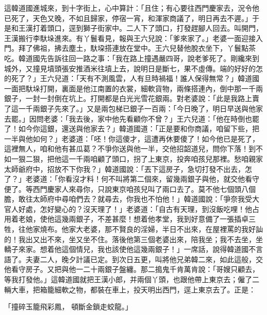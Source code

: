 \begin{showcontents}{}
這韓道國進城來，到十字街上，心中算計：「且住；有心要往西門慶家去，況令他已死了，天色又晚，不如且歸家，停宿一宵，和渾家商議了，明日再去不遲。」于是和王漢打着頭口，逕到獅子街家中。二人下了頭口，打發趕腳人回去。叫開門，王漢搬行李馱垛進來。有丫鬟看見，報與王六兒說：「爹來家了。」老婆一面迎接入門。拜了佛祖，拂去塵土，馱垜搭連放在堂中。王六兒替他脫衣坐下，丫鬟點茶吃。韓道國先告訴往回一路之事：「我在路上撞遇嚴四哥，說老爹死了。剛纔來到城外，又撞見墳頭張安推酒米往墳上去，說明日是斷七，果不虛傳。端的好好的怎的死了？」王六兒道：「天有不測風雲，人有旦時禍福！誰人保得無常？」韓道國一面把馱垛打開，裏面是他江南置的衣裳，細軟貨物，兩條搭連內，倒中那一千兩銀子，一封一封倒在坑上。打開都是白光光雪花銀兩。對老婆說：「此是我路上賣了這一千兩銀子先來了。」又是兩包梯已銀子一百兩：「今日晚了，明日早送與他家去罷。」因問老婆：「我去後，家中他先看顧你不曾？」王六兒道：「他在時倒也罷了！如今你這銀，還送與他家去？」韓道國道：「正是要和你商議，咱留下些，把一半與他如何？」老婆道：「呸！你這傻才，這遭再休要傻了！如今他已是死了，這裡無人，咱和他有甚瓜葛？不爭你送與他一半，交他招韶道兒，問你下落！到不如一狠二狠，把他這一千兩咱顧了頭口，拐了上東京，投奔咱孩兒那裡。愁咱親家太師爺府中，招放不下你我？」韓道國說：「丟下這房子，急切打發不出去，怎了？」老婆道：「你看沒才料！何不叫將第二個來，留幾兩銀子與他，就交他看守便了。等西門慶家人來尋你，只說東京咱孩兒叫了兩口去了。莫不他七個頭八個膽，敢往太師府中尋咱們去？就尋去，你我也不怕他！」韓道國說：「爭奈我受大官人好處，怎好變心的？沒天理了！」老婆道：「自古有天理，到沒飯吃哩！他占用着老娘，使他這幾兩銀子，不差甚麼！想着他孝堂，我到好意備了一張插卓三牲，往他家燒布。他家大老婆，那不賢良的淫婦，半日不出來，在屋裡罵的我好訕的！我出又出不來，坐又坐不住。落後他第三個老婆出來，陪我坐；我不去坐，坐轎子來家。想着他這個情兒，我也該使他這幾兩銀子！」一席話，說得韓道國不言語了。夫妻二人，晚夕計議已定。到次日五更，叫將他兄弟韓二來，如此這般，交他看守房子。又把與他一二十兩銀子盤纏。那二搗鬼千肯萬肯說：「哥嫂只顧去，等我打發他。」這韓道國就把王漢小郎，并兩個丫頭，也跟他帶上東京去；僱了二輛大車，把箱籠細軟之物，都裝在車上，投天明出西門，逕上東京去了。正是：

「撞碎玉籠飛彩鳳，  頓斷金鎖走蛟龍。」


\end{showcontents}
